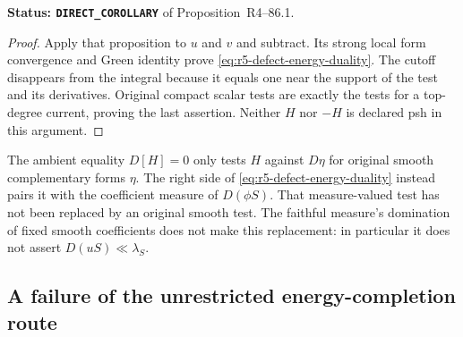 \documentclass[11pt,a4paper]{article}
\numberwithin{equation}{section}
\theoremstyle{definition}
\theoremstyle{remark}
\begin{document}
\noindent\textbf{Status: \texttt{DIRECT\_COROLLARY}} of
Proposition~\textup{R4--86.1}.

\begin{proof}
Apply that proposition to $u$ and $v$ and subtract. Its strong
local form convergence and Green identity prove
\eqref{eq:r5-defect-energy-duality}. The cutoff disappears from
the integral because it equals one near the support of the
test and its derivatives. Original compact scalar tests are
exactly the tests for a top-degree current, proving the last
assertion. Neither $H$ nor $-H$ is declared psh in this argument.
\end{proof}

The ambient equality $D[H]=0$ only tests $H$ against $D\eta$
for original smooth complementary forms $\eta$. The right side
of \eqref{eq:r5-defect-energy-duality} instead pairs it with the
coefficient measure of $D(\phi S)$. That measure-valued test
has not been replaced by an original smooth test. The faithful
measure's domination of fixed smooth coefficients does not make
this replacement: in particular it does not assert
$D(uS)\ll\lambda_S$.

\subsection{A failure of the unrestricted energy-completion route}
\end{document}
